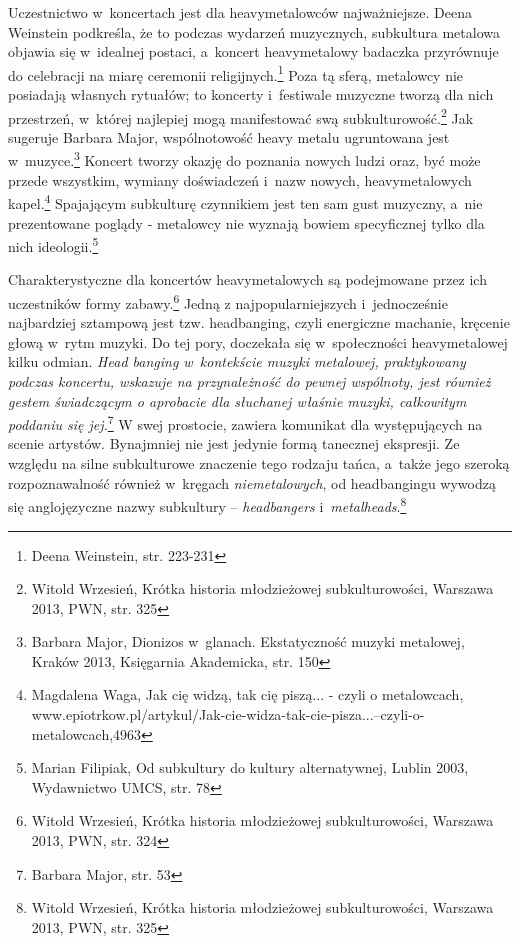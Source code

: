 \documentclass[12pt, a4paper, titlepage]{report}
\begin{document}
Uczestnictwo w~koncertach jest dla heavymetalowców najważniejsze. Deena Weinstein podkreśla, że to podczas wydarzeń muzycznych, subkultura metalowa objawia się w~idealnej postaci, a~koncert heavymetalowy badaczka przyrównuje do celebracji na miarę ceremonii religijnych.\footnote{Deena Weinstein, str. 223-231} Poza tą sferą, metalowcy nie posiadają własnych rytuałów; to koncerty i~festiwale muzyczne tworzą dla nich przestrzeń, w~której najlepiej mogą manifestować swą subkulturowość.\footnote{Witold Wrzesień, Krótka historia młodzieżowej subkulturowości, Warszawa 2013, PWN, \break str. 325} Jak sugeruje Barbara Major, wspólnotowość heavy metalu ugruntowana jest w~muzyce.\footnote{Barbara Major, Dionizos w~glanach. Ekstatyczność muzyki metalowej, Kraków 2013, Księgarnia Akademicka, str. 150} Koncert tworzy okazję do poznania nowych ludzi oraz, być może przede wszystkim, wymiany doświadczeń i~nazw nowych, heavymetalowych kapel.\footnote{Magdalena Waga, Jak cię widzą, tak cię piszą... - czyli o metalowcach, www.epiotrkow.pl\break /artykul/Jak-cie-widza-tak-cie-pisza...--czyli-o-metalowcach,4963} Spajającym subkulturę czynnikiem jest ten sam gust muzyczny, a~nie prezentowane poglądy - metalowcy nie wyznają bowiem specyficznej tylko dla nich ideologii.\footnote{Marian Filipiak, Od subkultury do kultury alternatywnej, Lublin 2003, Wydawnictwo UMCS, str. 78}

Charakterystyczne dla koncertów heavymetalowych są podejmowane przez ich uczestników formy zabawy.\footnote{Witold Wrzesień, Krótka historia młodzieżowej subkulturowości, Warszawa 2013, PWN, \break str. 324} Jedną z najpopularniejszych i~jednocześnie najbardziej sztampową jest tzw. headbanging, czyli energiczne machanie, kręcenie głową w~rytm muzyki. Do tej pory, doczekała się w~społeczności heavymetalowej kilku odmian. \textit{Head banging w~kontekście muzyki metalowej, praktykowany podczas koncertu, wskazuje na przynależność do pewnej wspólnoty, jest również gestem świadczącym o aprobacie dla słuchanej właśnie muzyki, całkowitym poddaniu się jej.}\footnote{Barbara Major, str. 53} W swej prostocie, zawiera komunikat dla występujących na scenie artystów. Bynajmniej nie jest jedynie formą tanecznej ekspresji. Ze względu na silne subkulturowe znaczenie tego rodzaju tańca, a~także jego szeroką rozpoznawalność również w~kręgach \textit{niemetalowych}, od headbangingu wywodzą się anglojęzyczne nazwy subkultury -- \textit{headbangers} i~\textit{metalheads}.\footnote{Witold Wrzesień, Krótka historia młodzieżowej subkulturowości, Warszawa 2013, PWN, \break str. 325} 
\end{document}
